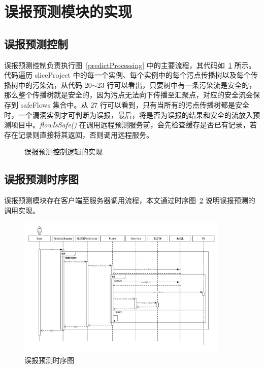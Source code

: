 \section{误报预测模块的实现}

\subsection{误报预测控制}
误报预测控制负责执行图~\ref{predictProcessing} 中的主要流程，其代码如~\ref{code:predictRunner} 所示。
代码遍历 sliceProject 中的每一个实例、每个实例中的每个污点传播树以及每个传播树中的污染流，从代码 20$\sim$23 行可以看出，只要树中有一条污染流是安全的，那么整个传播树就是安全的，因为污点无法向下传播至汇聚点，对应的安全流会保存到 safeFlows 集合中。从 27 行可以看到，只有当所有的污点传播树都是安全时，一个漏洞实例才可判断为误报，最后，将是否为误报的结果和安全的流放入预测项目中。\textit{flowIsSafe()} 在调用远程预测服务前，会先检查缓存是否已有记录，若存在记录则直接将其返回，否则调用远程服务。

\begin{figure}[htbp]
    \centering
    \begin{minipage}{0.9\textwidth}
        
    \end{minipage}
    \caption{误报预测控制逻辑的实现}\label{code:predictRunner}
\end{figure}


\subsection{误报预测时序图}
误报预测模块存在客户端至服务器调用流程，本文通过时序图~\ref{predictTime} 说明误报预测的调用实现。

\begin{figure}[!htb]
    \centering
    \includegraphics[width=0.9\textwidth]{FIGs/chapter4/predictTime.pdf}
    \caption{误报预测时序图}\label{predictTime}
\end{figure}

